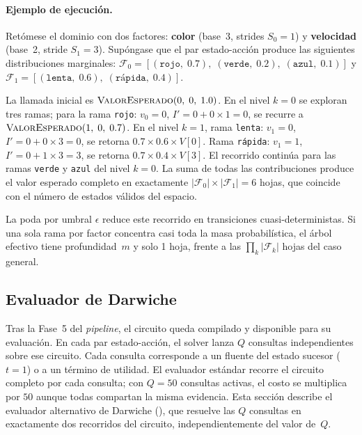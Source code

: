 \paragraph{Ejemplo de ejecución.}
Retómese el dominio con dos factores: \textbf{color} (base~3, strides $S_0 = 1$)
y \textbf{velocidad} (base~2, stride $S_1 = 3$). Supóngase que el par estado-acción
produce las siguientes distribuciones marginales: $\mathcal{F}_0 =
[(\texttt{rojo},\; 0.7),\; (\texttt{verde},\; 0.2),\; (\texttt{azul},\; 0.1)]$ y
$\mathcal{F}_1 = [(\texttt{lenta},\; 0.6),\; (\texttt{rápida},\; 0.4)]$.

La llamada inicial es $\textsc{ValorEsperado}(0,\; 0,\; 1.0)$. En el nivel $k=0$
se exploran tres ramas; para la rama \texttt{rojo}: $v_0 = 0$, $I' = 0 + 0
\times 1 = 0$, se recurre a $\textsc{ValorEsperado}(1,\; 0,\; 0.7)$. En el nivel
$k=1$, rama \texttt{lenta}: $v_1 = 0$, $I' = 0 + 0 \times 3 = 0$, se retorna
$0.7 \times 0.6 \times V[0]$. Rama \texttt{rápida}: $v_1 = 1$, $I' = 0 + 1
\times 3 = 3$, se retorna $0.7 \times 0.4 \times V[3]$. El recorrido continúa para
las ramas \texttt{verde} y \texttt{azul} del nivel $k=0$. La suma de todas las
contribuciones produce el valor esperado completo en exactamente
$|\mathcal{F}_0| \times |\mathcal{F}_1| = 6$ hojas, que coincide con el número
de estados válidos del espacio.

\clearpage

La poda por umbral $\epsilon$ reduce este recorrido en transiciones
cuasi-deterministas. Si una sola rama por factor concentra casi toda la masa
probabilística, el árbol efectivo tiene profundidad~$m$ y solo 1 hoja, frente a
las $\prod_k |\mathcal{F}_k|$ hojas del caso general.


\subsection{Evaluador de Darwiche}
\label{sec:di-darwiche}

Tras la Fase~5 del \textit{pipeline}, el circuito queda compilado y disponible
para su evaluación. En cada par estado-acción, el solver lanza $Q$ consultas independientes sobre
ese circuito. Cada consulta corresponde a un fluente del estado sucesor
($t = 1$) o a un término de utilidad. El evaluador estándar recorre el circuito
completo por cada consulta; con $Q = 50$ consultas activas, el costo se
multiplica por $50$ aunque todas compartan la misma evidencia. Esta sección
describe el evaluador alternativo de Darwiche
(\citeyear{darwiche2003differential}), que resuelve las $Q$ consultas en
exactamente dos recorridos del circuito, independientemente del valor de~$Q$.

